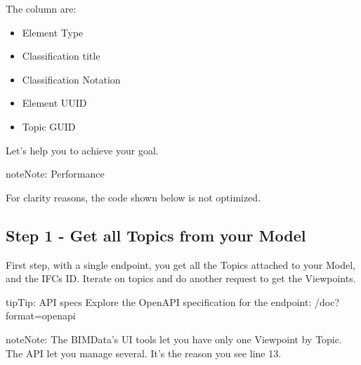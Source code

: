 \documentclass[a4paper,12pt,english]{sphinxmanual}
\begin{document}
The column are:
\begin{itemize}
\item {} 
Element Type

\item {} 
Classification title

\item {} 
Classification Notation

\item {} 
Element UUID

\item {} 
Topic GUID

\end{itemize}

Let’s help you to achieve your goal.

\begin{sphinxadmonition}{note}{Note:}
Performance

For clarity reasons, the code shown below is not optimized.
\end{sphinxadmonition}


\subsection{Step 1 - Get all Topics from your Model}
\label{\detokenize{tutorials/export_excel:step-1-get-all-topics-from-your-model}}
First step, with a single endpoint, you get all the Topics attached to your Model, and the IFCs ID.
Iterate on topics and do another request to get the Viewpoints.

\begin{sphinxadmonition}{tip}{Tip:}
API specs
Explore the OpenAPI specification for the endpoint: /doc?format=openapi
\end{sphinxadmonition}

\begin{sphinxadmonition}{note}{Note:}
The BIMData’s UI tools let you have only one Viewpoint by Topic. The API let you manage several.
It’s the reason you see  line 13.
\end{sphinxadmonition}
\end{document}

